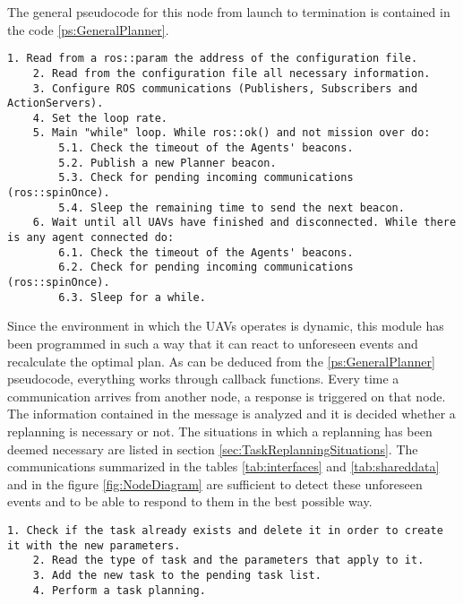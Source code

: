 The general pseudocode for this node from launch to termination is contained in the code \ref{ps:GeneralPlanner}.

\begin{lstlisting}[caption={General operation of \emph{High-Level Planner}'s code}, breaklines=true, label=ps:GeneralPlanner]
	1. Read from a ros::param the address of the configuration file.
	2. Read from the configuration file all necessary information.
	3. Configure ROS communications (Publishers, Subscribers and ActionServers).
	4. Set the loop rate.
	5. Main "while" loop. While ros::ok() and not mission over do:
		5.1. Check the timeout of the Agents' beacons.
		5.2. Publish a new Planner beacon.
		5.3. Check for pending incoming communications (ros::spinOnce).
		5.4. Sleep the remaining time to send the next beacon.
	6. Wait until all UAVs have finished and disconnected. While there is any agent connected do:
		6.1. Check the timeout of the Agents' beacons.
		6.2. Check for pending incoming communications (ros::spinOnce).
		6.3. Sleep for a while.
\end{lstlisting}

Since the environment in which the \glspl{UAV} operates is dynamic, this module has been programmed in such a way that it can react to unforeseen events and recalculate the optimal plan. As can be deduced from the \ref{ps:GeneralPlanner} pseudocode, everything works through callback functions. Every time a communication arrives from another node, a response is triggered on that node. The information contained in the message is analyzed and it is decided whether a replanning is necessary or not. The situations in which a replanning has been deemed necessary are listed in section \ref{sec:TaskReplanningSituations}. The communications summarized in the tables \ref{tab:interfaces} and \ref{tab:shareddata} and in the figure \ref{fig:NodeDiagram} are sufficient to detect these unforeseen events and to be able to respond to them in the best possible way.

\begin{lstlisting}[caption={Task callback pseudocode}, breaklines=true, label=ps:IncomingTask]
	1. Check if the task already exists and delete it in order to create it with the new parameters.
	2. Read the type of task and the parameters that apply to it.
	3. Add the new task to the pending task list.
	4. Perform a task planning.
\end{lstlisting}

